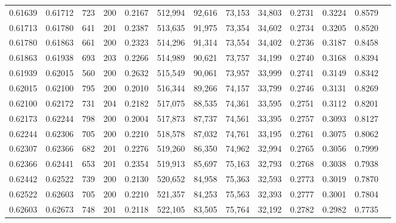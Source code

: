\begin{tabular}{rrrrrrrrrrrrr}
0.61639 & 0.61712 &   723 & 200 &                                     0.2167 & 512,994 &  92,616 &  73,153 &  34,803 & 0.2731 & 0.3224 & 0.8579 \\
0.61713 & 0.61780 &   641 & 201 &                                     0.2387 & 513,635 &  91,975 &  73,354 &  34,602 & 0.2734 & 0.3205 & 0.8520 \\
0.61780 & 0.61863 &   661 & 200 &                                     0.2323 & 514,296 &  91,314 &  73,554 &  34,402 & 0.2736 & 0.3187 & 0.8458 \\
0.61863 & 0.61938 &   693 & 203 &                                     0.2266 & 514,989 &  90,621 &  73,757 &  34,199 & 0.2740 & 0.3168 & 0.8394 \\
0.61939 & 0.62015 &   560 & 200 &                                     0.2632 & 515,549 &  90,061 &  73,957 &  33,999 & 0.2741 & 0.3149 & 0.8342 \\
0.62015 & 0.62100 &   795 & 200 &                                     0.2010 & 516,344 &  89,266 &  74,157 &  33,799 & 0.2746 & 0.3131 & 0.8269 \\
0.62100 & 0.62172 &   731 & 204 &                                     0.2182 & 517,075 &  88,535 &  74,361 &  33,595 & 0.2751 & 0.3112 & 0.8201 \\
0.62173 & 0.62244 &   798 & 200 &                                     0.2004 & 517,873 &  87,737 &  74,561 &  33,395 & 0.2757 & 0.3093 & 0.8127 \\
0.62244 & 0.62306 &   705 & 200 &                                     0.2210 & 518,578 &  87,032 &  74,761 &  33,195 & 0.2761 & 0.3075 & 0.8062 \\
0.62307 & 0.62366 &   682 & 201 &                                     0.2276 & 519,260 &  86,350 &  74,962 &  32,994 & 0.2765 & 0.3056 & 0.7999 \\
0.62366 & 0.62441 &   653 & 201 &                                     0.2354 & 519,913 &  85,697 &  75,163 &  32,793 & 0.2768 & 0.3038 & 0.7938 \\
0.62442 & 0.62522 &   739 & 200 &                                     0.2130 & 520,652 &  84,958 &  75,363 &  32,593 & 0.2773 & 0.3019 & 0.7870 \\
0.62522 & 0.62603 &   705 & 200 &                                     0.2210 & 521,357 &  84,253 &  75,563 &  32,393 & 0.2777 & 0.3001 & 0.7804 \\
0.62603 & 0.62673 &   748 & 201 &                                     0.2118 & 522,105 &  83,505 &  75,764 &  32,192 & 0.2782 & 0.2982 & 0.7735 \\

\end{tabular}
